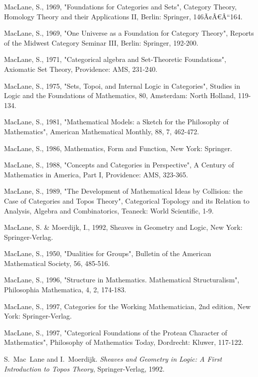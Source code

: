 \documentclass[12pt]{article}
\begin{document}
\begin{thebibliography}{199}
MacLane, S., 1969, "Foundations for Categories and Sets", Category Theory, Homology Theory and their Applications II, Berlin: Springer, 146Ã¢Â€Â“164. 

MacLane, S., 1969, "One Universe as a Foundation for Category Theory", Reports of the Midwest Category Seminar III, Berlin: Springer, 192-200. 

MacLane, S., 1971, "Categorical algebra and Set-Theoretic Foundations", Axiomatic Set Theory, Providence: AMS, 231-240. 

MacLane, S., 1975, "Sets, Topoi, and Internal Logic in Categories", Studies in Logic and the Foundations of Mathematics, 80, Amsterdam: North Holland, 119-134. 

MacLane, S., 1981, "Mathematical Models: a Sketch for the Philosophy of Mathematics", American Mathematical Monthly, 88, 7, 462-472.
 
MacLane, S., 1986, Mathematics, Form and Function, New York: Springer. 

MacLane, S., 1988, "Concepts and Categories in Perspective", A Century of Mathematics in America, Part I, Providence: AMS, 323-365. 

MacLane, S., 1989, "The Development of Mathematical Ideas by Collision: the Case of Categories and Topos Theory", Categorical Topology and its Relation to Analysis, Algebra and Combinatorics, Teaneck: World Scientific, 1-9.

MacLane, S. \& Moerdijk, I., 1992, Sheaves in Geometry and Logic, New York: Springer-Verlag. 

MacLane, S., 1950, "Dualities for Groups", Bulletin of the American Mathematical Society, 56, 485-516. 

MacLane, S., 1996, "Structure in Mathematics. Mathematical Structuralism", Philosophia Mathematica, 4, 2, 174-183. 

MacLane, S., 1997, Categories for the Working Mathematician, 2nd edition, New York: Springer-Verlag. 

MacLane, S., 1997, "Categorical Foundations of the Protean Character of Mathematics", Philosophy of Mathematics Today, Dordrecht: Kluwer, 117-122. 

S.~Mac~Lane and I.~Moerdijk. {\em Sheaves and Geometry in Logic: A First Introduction to Topos Theory}, Springer-Verlag, 1992.


\end{thebibliography}
\end{document}
